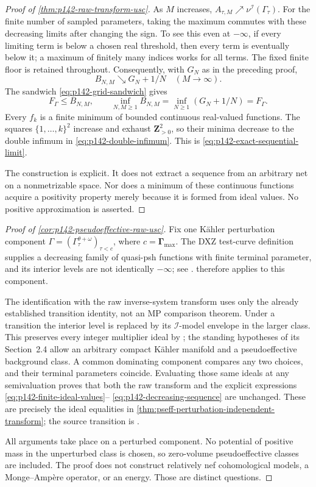 \begin{proof}[Proof of \cref{thm:p142-raw-transform-usc}]
As $M$ increases, $A_{\tau,M}\nearrow\nu^{\mathcal I}(\Gamma_\tau)$.
For the finite number of sampled parameters, taking the maximum commutes
with these decreasing limits after changing the sign. To see this even
at $-\infty$, if every limiting term is below a chosen real threshold,
then every term is eventually below it; a maximum of finitely many
indices works for all terms. The fixed finite floor is retained throughout.
Consequently, with $G_N$ as in the preceding proof,
\[
           B_{N,M}\searrow G_N+1/N\quad(M\to\infty).
\]
The sandwich \eqref{eq:p142-grid-sandwich} gives
\[
 F_\Gamma\leq B_{N,M},\qquad
 \inf_{N,M\geq1}B_{N,M}
      =\inf_{N\geq1}(G_N+1/N)=F_\Gamma.
 \tag{71.33j}
 \label{eq:p142-double-infimum}
\]
Every $f_k$ is a finite minimum of bounded continuous real-valued
functions. The squares $\{1,\ldots,k\}^2$ increase and exhaust
$\mathbf Z_{>0}^2$, so their minima decrease to the double infimum
in \eqref{eq:p142-double-infimum}. This is
\eqref{eq:p142-exact-sequential-limit}.

The construction is explicit. It does not extract a sequence from an
arbitrary net on a nonmetrizable space. Nor does a minimum of these
continuous functions acquire a positivity property merely because it
is formed from ideal values. No positive approximation is asserted.
\end{proof}

\begin{proof}[Proof of \cref{cor:p142-pseudoeffective-raw-usc}]
Fix one K\"ahler perturbation component
$\Gamma=(\Gamma^{\theta+\omega}_\tau)_{\tau<c}$, where
$c=\boldsymbol\Gamma_{\max}$. The DXZ test-curve definition supplies
a decreasing family of quasi-psh functions with finite terminal
parameter, and its interior levels are not identically $-\infty$;
see \cite[Section~2.2, Definition~3.3]{DXZ23}.
 therefore applies to this component.

The identification with the raw inverse-system transform uses only the
already established transition identity, not an MP comparison theorem.
Under a transition the interior level is replaced by its
$\mathcal I$-model envelope in the larger class. This preserves every
integer multiplier ideal by \cite[Proposition~2.18(ii)]{DX22}; the
standing hypotheses of its Section~2.4 allow an arbitrary compact
K\"ahler manifold and a pseudoeffective background class. A common
dominating component compares any
two choices, and their terminal parameters coincide. Evaluating those
same ideals at any semivaluation proves that both the raw transform and
the explicit expressions \eqref{eq:p142-finite-ideal-values}--
\eqref{eq:p142-decreasing-sequence} are unchanged. These are precisely
the ideal equalities in
\cref{thm:pseff-perturbation-independent-transform}; the source
transition is \cite[formula~(28), Definition~3.3]{DXZ23}.

All arguments take place on a perturbed component. No potential of
positive mass in the unperturbed class is chosen, so zero-volume
pseudoeffective classes are included. The proof does not construct
relatively nef cohomological models, a Monge--Amp\`ere operator, or an
energy. Those are distinct questions.
\end{proof}
